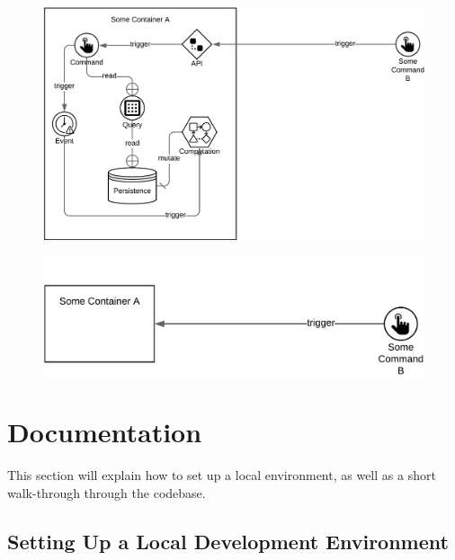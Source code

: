 \begin{figure}[h]
\centering
\includegraphics[scale=.35]{Bilder/CollapsableEx.png}
\label{ex:CollExpanded}

\includegraphics[scale=.4]{Bilder/CollapsableCol.png}
\label{ex:CollColapsed}
\end{figure}

\chapter{Documentation}
\label{chap:Doc}
This section will explain how to set up a local environment, as well as a short walk-through through the codebase.

\section{Setting Up a Local Development Environment}
